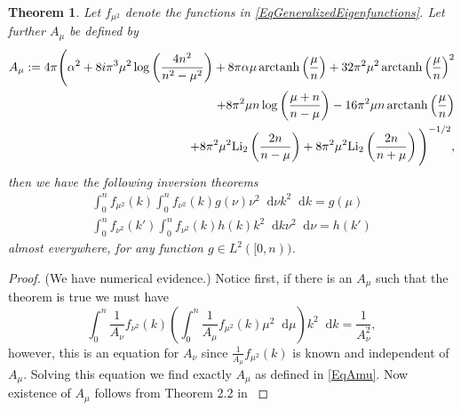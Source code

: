 \documentclass[a4paper,11pt]{article}
\DeclareMathOperator\arctanh{arctanh}
\newcommand*\diff{\mathop{}\!\mathrm{d}}
\newtheorem{theorem}{Theorem}
\numberwithin{equation}{section}
\begin{document}
	\begin{theorem}
		Let $ f_{\mu^2} $ denote the functions in \eqref{EqGeneralizedEigenfunctions}. Let further $ A_\mu $ be defined by\begin{equation}\label{EqAmu}
		\begin{aligned}
		A_\mu:=4 \pi \Bigg(\alpha ^2+8 i \pi ^3 \mu ^2 \log \left(\frac{4 n^2}{n^2-\mu
					^2}\right)+8 \pi  \alpha  \mu  \arctanh\left(\frac{\mu }{n}\right)+32 \pi
				^2 \mu ^2 \arctanh\left(\frac{\mu }{n}\right)^2\\+8 \pi ^2 \mu  n \log
				\left(\frac{\mu +n}{n-\mu }\right)-16 \pi ^2 \mu  n \arctanh\left(\frac{\mu
				}{n}\right)\\+8 \pi ^2 \mu ^2 \textnormal{Li}_2\left(\frac{2 n}{n-\mu }\right)+8 \pi
				^2 \mu ^2 \textnormal{Li}_2\left(\frac{2 n}{n+\mu }\right)\Bigg)^{-1/2},
				\end{aligned}
		\end{equation}
		then we have the following inversion theorems\begin{equation}
		\begin{aligned}
		\int_{0}^{n}f_{\mu^2}(k)\int_{0}^{n}f_{\nu^2}(k) g(\nu) \nu^2\diff\nu k^2\diff k=g(\mu)\\
		\int_{0}^{n}f_{\nu^2}(k')\int_{0}^{n}f_{\nu^2}(k) h(k)k^2\diff k \nu^2\diff\nu =h(k')
		\end{aligned}
		\end{equation}
		almost everywhere, for any function $ g\in L^2([0,n)) $.
	\end{theorem}
	\begin{proof}
		(We have numerical evidence.)
		Notice first, if there is an $ A_\mu $ such that the theorem is true we must have 
		\begin{equation}
		\int_{0}^{n} \frac{1}{A_\nu}f_{\nu^2}(k) \left(\int_{0}^{n}\frac{1}{A_\mu}f_{\mu^2}(k)\mu^2\diff\mu\right)k^2\diff k=\frac{1}{A_\nu^2},
		\end{equation}
		however, this is an equation for $ A_\nu $ since $ \frac{1}{A_\mu}f_{\mu^2}(k) $ is known and independent of $ A_\mu $. Solving this equation we find exactly $ A_\mu $ as defined in \eqref{EqAmu}. Now existence of $ A_\mu $ follows from Theorem 2.2 in \cite{berezanskii1968expansions}
	\end{proof}
\end{document}
